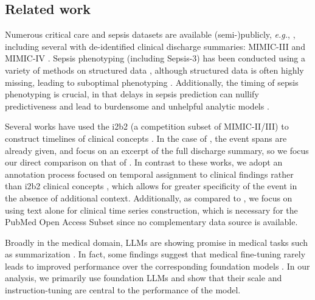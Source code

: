 \documentclass[pmlr,twocolumn,10pt]{jmlr} %
\begin{document}
\begin{sloppypar}
\subsection{Related work}
Numerous critical care and sepsis datasets are available \mbox{(semi-)publicly}, \emph{e.g.}, \cite{thoral2021sharing,pollard2018eicu}, including several with de-identified clinical discharge summaries: MIMIC-III \citep{johnson2016mimic}
and MIMIC-IV \citep{johnson2023mimic}. 
Sepsis phenotyping (including Sepsis-3) has been conducted using a variety of methods on structured data \citep{johnson2018comparative}, although structured data is often highly missing, leading to suboptimal phenotyping \citep{seinen2025using}.
Additionally, the timing of sepsis phenotyping is crucial, in that delays in sepsis prediction can nullify predictiveness and lead to burdensome and unhelpful analytic models \citep{kamran2024evaluation}.  
\end{sloppypar}

Several works have used the i2b2 (a competition subset of MIMIC-II/III) to construct timelines of clinical concepts \citep{leeuwenberg2020towards,frattallone2024using}.  
In the case of \cite{leeuwenberg2020towards}, the event spans are already given, and focus on an excerpt of the full discharge summary, so we focus our direct comparison on that of \cite{frattallone2024using}.
In contrast to these works, we adopt an annotation process focused on temporal assignment to clinical findings rather than i2b2 clinical concepts \citep{uzuner20112010}, which allows for greater specificity of the event in the absence of additional context.  
Additionally, as compared to \cite{frattallone2024using},
we focus on using text alone for clinical time series construction, which is necessary for the PubMed Open Access Subset since no complementary data source is available.

Broadly in the medical domain, LLMs are showing promise in medical tasks such as summarization \citep{van2024adapted}.
In fact, some findings suggest that 
medical fine-tuning rarely leads to improved performance over the corresponding foundation models \citep{jeong-etal-2024-medical}. 
In our analysis, we primarily use foundation LLMs and show that their scale and instruction-tuning are central to the performance of the model.  
\end{document}
